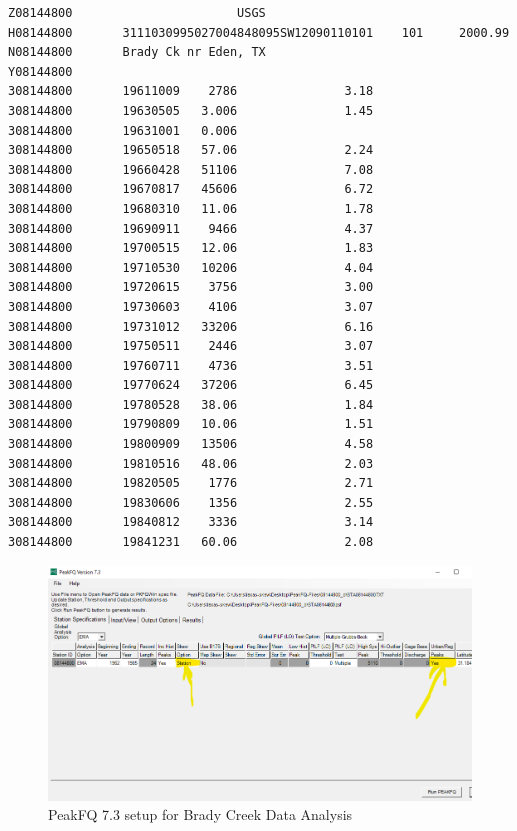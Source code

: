 \documentclass[12pt]{article}
\begin{document}
\begin{enumerate}
\begin{verbatim}
Z08144800                       USGS 
H08144800       3111030995027004848095SW12090110101    101     2000.99          
N08144800       Brady Ck nr Eden, TX
Y08144800       
308144800       19611009    2786               3.18                      
308144800       19630505   3.006               1.45                      
308144800       19631001   0.006                                         
308144800       19650518   57.06               2.24                      
308144800       19660428   51106               7.08                      
308144800       19670817   45606               6.72                      
308144800       19680310   11.06               1.78                      
308144800       19690911    9466               4.37                      
308144800       19700515   12.06               1.83                      
308144800       19710530   10206               4.04                      
308144800       19720615    3756               3.00                      
308144800       19730603    4106               3.07                      
308144800       19731012   33206               6.16                      
308144800       19750511    2446               3.07                      
308144800       19760711    4736               3.51                      
308144800       19770624   37206               6.45                      
308144800       19780528   38.06               1.84                      
308144800       19790809   10.06               1.51                      
308144800       19800909   13506               4.58                      
308144800       19810516   48.06               2.03                      
308144800       19820505    1776               2.71                      
308144800       19830606    1356               2.55                      
308144800       19840812    3336               3.14                      
308144800       19841231   60.06               2.08  
\end{verbatim}

\begin{figure}[h!] %
   \centering
   \includegraphics[width=6in]{BradyCreekSetup.png} 
   \caption{PeakFQ 7.3 setup for Brady Creek Data Analysis}
   \label{fig:BradyCreekSetuo}
\end{figure}


\end{enumerate}
\end{document}
